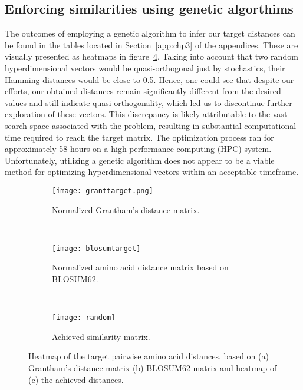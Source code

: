 \subsection{Enforcing similarities using genetic algorthims}
The outcomes of employing a genetic algorithm to infer our target distances can be found in the tables located in Section~\ref{app:chp3} of the appendices. These are visually presented as heatmaps in figure~\ref{fig:ga}. Taking into account that two random hyperdimensional vectors would be quasi-orthogonal just by stochastics, their Hamming distances would be close to 0.5. Hence, one could see that despite our efforts, our obtained distances remain significantly different from the desired values and still indicate quasi-orthogonality, which led us to discontinue further exploration of these vectors. This discrepancy is likely attributable to the vast search space associated with the problem, resulting in substantial computational time required to reach the target matrix. The optimization process ran for approximately 58 hours on a high-performance computing (HPC) system. Unfortunately, utilizing a genetic algorithm does not appear to be a viable method for optimizing hyperdimensional vectors within an acceptable timeframe.

\begin{figure}[H]
    \centering
    \begin{minipage}[b]{.5\textwidth}
    \begin{subfigure}[b]{\textwidth}
        \texttt{[image: granttarget.png]}
        \caption{Normalized Grantham's distance matrix.}
        \label{fig:grant}
    \end{subfigure}
\end{minipage}
\\
\centering
    \begin{minipage}[b]{.5\textwidth}
    \begin{subfigure}[b]{\textwidth}
        \texttt{[image: blosumtarget]}
        \caption{Normalized amino acid distance matrix based on BLOSUM62.}
        \label{fig:blosum}
    \end{subfigure}
    \end{minipage}
\\
\centering
    \begin{minipage}[b]{.5\textwidth}
    \begin{subfigure}[b]{\textwidth}
        \texttt{[image: random]}
        \caption{Achieved similarity matrix.}
        \label{fig:random}
    \end{subfigure}
    \end{minipage}
    \caption{Heatmap of the target pairwise amino acid distances, based on (a) Grantham's distance matrix (b) BLOSUM62 matrix and heatmap of (c) the achieved distances.}
    \label{fig:ga}
\end{figure}
